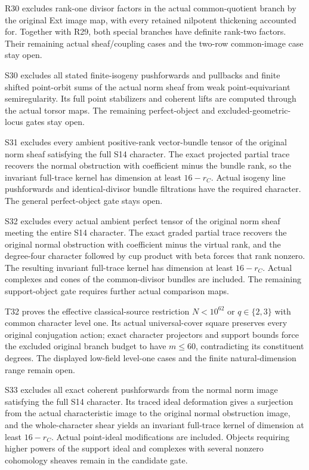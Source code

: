 R30 excludes rank-one divisor factors in the actual common-quotient branch by the original Ext image map, with every retained nilpotent thickening accounted for. Together with R29, both special branches have definite rank-two factors. Their remaining actual sheaf/coupling cases and the two-row common-image case stay open.




S30 excludes all stated finite-isogeny pushforwards and pullbacks and finite shifted point-orbit sums of the actual norm sheaf from weak point-equivariant semiregularity. Its full point stabilizers and coherent lifts are computed through the actual torsor maps. The remaining perfect-object and excluded-geometric-locus gates stay open.




S31 excludes every ambient positive-rank vector-bundle tensor of the original norm sheaf satisfying the full S14 character. The exact projected partial trace recovers the normal obstruction with coefficient minus the bundle rank, so the invariant full-trace kernel has dimension at least $16-r_C$. Actual isogeny line pushforwards and identical-divisor bundle filtrations have the required character. The general perfect-object gate stays open.




S32 excludes every actual ambient perfect tensor of the original norm sheaf meeting the entire S14 character. The exact graded partial trace recovers the original normal obstruction with coefficient minus the virtual rank, and the degree-four character followed by cup product with beta forces that rank nonzero. The resulting invariant full-trace kernel has dimension at least $16-r_C$. Actual complexes and cones of the common-divisor bundles are included. The remaining support-object gate requires further actual comparison maps.




T32 proves the effective classical-source restriction $N<10^{62}$ or $q\in\{2,3\}$ with common character level one. Its actual universal-cover square preserves every original conjugation action; exact character projectors and support bounds force the excluded original branch budget to have $m\le60$, contradicting its constituent degrees. The displayed low-field level-one cases and the finite natural-dimension range remain open.




S33 excludes all exact coherent pushforwards from the normal norm image satisfying the full S14 character. Its traced ideal deformation gives a surjection from the actual characteristic image to the original normal obstruction image, and the whole-character shear yields an invariant full-trace kernel of dimension at least $16-r_C$. Actual point-ideal modifications are included. Objects requiring higher powers of the support ideal and complexes with several nonzero cohomology sheaves remain in the candidate gate.




